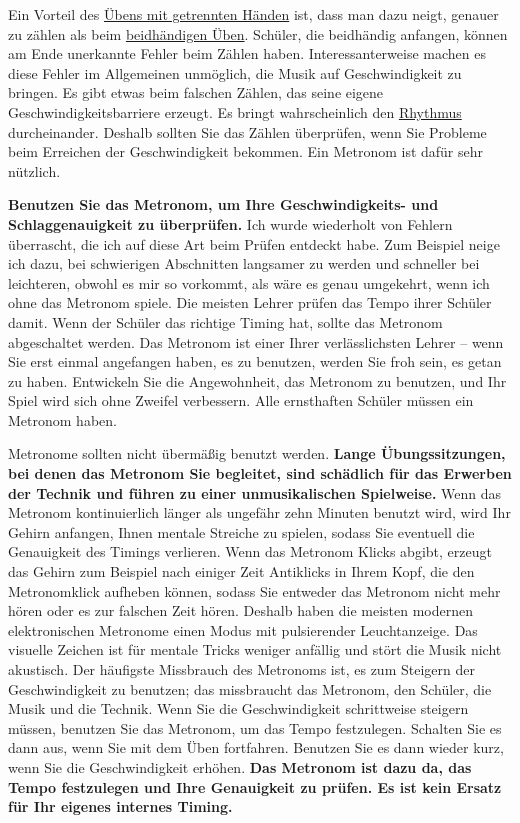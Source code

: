 Ein Vorteil des \hyperref[c1ii7]{Übens mit getrennten Händen} ist, dass man dazu neigt, genauer zu zählen als beim \hyperref[c1ii25]{beidhändigen Üben}.
Schüler, die beidhändig anfangen, können am Ende unerkannte Fehler beim Zählen haben.
Interessanterweise machen es diese Fehler im Allgemeinen unmöglich, die Musik auf Geschwindigkeit zu bringen.
Es gibt etwas beim falschen Zählen, das seine eigene Geschwindigkeitsbarriere erzeugt.
Es bringt wahrscheinlich den \hyperref[c1iii1b]{Rhythmus} durcheinander.
Deshalb sollten Sie das Zählen überprüfen, wenn Sie Probleme beim Erreichen der Geschwindigkeit bekommen.
Ein Metronom ist dafür sehr nützlich.

\textbf{Benutzen Sie das Metronom, um Ihre Geschwindigkeits- und Schlaggenauigkeit zu überprüfen.}
Ich wurde wiederholt von Fehlern überrascht, die ich auf diese Art beim Prüfen entdeckt habe.
Zum Beispiel neige ich dazu, bei schwierigen Abschnitten langsamer zu werden und schneller bei leichteren, obwohl es mir so vorkommt, als wäre es genau umgekehrt, wenn ich ohne das Metronom spiele.
Die meisten Lehrer prüfen das Tempo ihrer Schüler damit.
Wenn der Schüler das richtige Timing hat, sollte das Metronom abgeschaltet werden.
Das Metronom ist einer Ihrer verlässlichsten Lehrer -- wenn Sie erst einmal angefangen haben, es zu benutzen, werden Sie froh sein, es getan zu haben.
Entwickeln Sie die Angewohnheit, das Metronom zu benutzen, und Ihr Spiel wird sich ohne Zweifel verbessern.
Alle ernsthaften Schüler müssen ein Metronom haben.

Metronome sollten nicht übermäßig benutzt werden.
\textbf{Lange Übungssitzungen, bei denen das Metronom Sie begleitet, sind schädlich für das Erwerben der Technik und führen zu einer unmusikalischen Spielweise.}
Wenn das Metronom kontinuierlich länger als ungefähr zehn Minuten benutzt wird, wird Ihr Gehirn anfangen, Ihnen mentale Streiche zu spielen, sodass Sie eventuell die Genauigkeit des Timings verlieren.
Wenn das Metronom Klicks abgibt, erzeugt das Gehirn zum Beispiel nach einiger Zeit Antiklicks in Ihrem Kopf, die den Metronomklick aufheben können, sodass Sie entweder das Metronom nicht mehr hören oder es zur falschen Zeit hören.
Deshalb haben die meisten modernen elektronischen Metronome einen Modus mit pulsierender Leuchtanzeige.
Das visuelle Zeichen ist für mentale Tricks weniger anfällig und stört die Musik nicht akustisch.
Der häufigste Missbrauch des Metronoms ist, es zum Steigern der Geschwindigkeit zu benutzen; das missbraucht das Metronom, den Schüler, die Musik und die Technik.
Wenn Sie die Geschwindigkeit schrittweise steigern müssen, benutzen Sie das Metronom, um das Tempo festzulegen.
Schalten Sie es dann aus, wenn Sie mit dem Üben fortfahren.
Benutzen Sie es dann wieder kurz, wenn Sie die Geschwindigkeit erhöhen.
\textbf{Das Metronom ist dazu da, das Tempo festzulegen und Ihre Genauigkeit zu prüfen.
Es ist kein Ersatz für Ihr eigenes internes Timing.}

